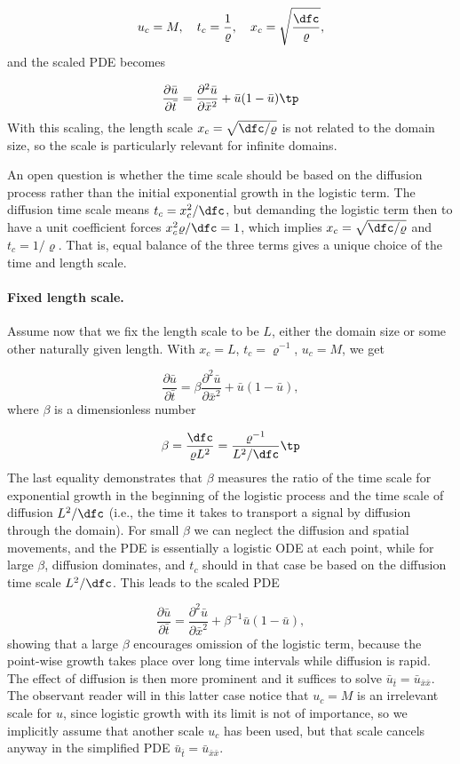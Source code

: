 \documentclass[graybox,envcountchap,sectrefs,final]{svmonodo}
\begin{document}
\[ u_c=M,\quad t_c = \frac{1}{\varrho},\quad x_c = \sqrt{\frac{\dfc}{\varrho}},
\]
and the scaled PDE becomes

\begin{equation}
\frac{\partial \bar u}{\partial \bar t} =
\frac{\partial^2 \bar u}{\partial\bar x^2} + \bar u (1 - \bar u)\tp
\end{equation}
With this scaling, the length scale $x_c=\sqrt{\dfc/\varrho}$
is not related to the domain size, so the scale is particularly relevant for
infinite domains.

An open question is whether the time scale should be based on
the diffusion process rather than the initial exponential growth
in the logistic term. The diffusion time scale means $t_c = x_c^2/\dfc$,
but demanding the logistic term then to have a unit coefficient
forces $x_c^2\varrho /\dfc = 1$, which implies $x_c=\sqrt{\dfc/\varrho}$
and $t_c=1/\varrho$. That is, equal balance of the three
terms gives a unique choice of the time and length scale.

\paragraph{Fixed length scale.}
Assume now that we fix the length scale to be $L$, either the
domain size or some other naturally given length. With
$x_c=L$, $t_c=\varrho^{-1}$,
$u_c=M$, we get

\begin{equation}
\frac{\partial \bar u}{\partial \bar t} =
\beta
\frac{\partial^2 \bar u}{\partial\bar x^2} + \bar u (1 - \bar u),
\end{equation}
where $\beta$ is a dimensionless number

\[ \beta = \frac{\dfc}{\varrho L^2} = \frac{\varrho^{-1}}{L^2/\dfc}\tp\]
The last equality demonstrates that $\beta$ measures the ratio of the
time scale for exponential growth in the beginning of the logistic
process and the time scale of diffusion $L^2/\dfc$ (i.e., the time it
takes to transport a signal by diffusion through the domain).  For
small $\beta$ we can neglect the diffusion and spatial movements, and
the PDE is essentially a logistic ODE at each point, while for large
$\beta$, diffusion dominates, and $t_c$ should in that case be based
on the diffusion time scale $L^2/\dfc$. This leads to the scaled PDE

\begin{equation}
\frac{\partial \bar u}{\partial \bar t} =
\frac{\partial^2 \bar u}{\partial\bar x^2} + \beta^{-1}\bar u (1 - \bar u),
\end{equation}
showing that a large $\beta$ encourages omission of the logistic term,
because the point-wise growth takes place over long time intervals while
diffusion is rapid. The effect of diffusion is then more prominent
and it suffices to solve $\bar u_{\bar t} = \bar u_{\bar x\bar x}$.
The observant reader will in this latter case notice that $u_c=M$
is an irrelevant scale for $u$, since logistic growth with its limit is
not of importance, so we implicitly assume that another scale $u_c$
has been used, but that scale cancels anyway in the simplified PDE
$\bar u_{\bar t} = \bar u_{\bar x\bar x}$.
\end{document}
